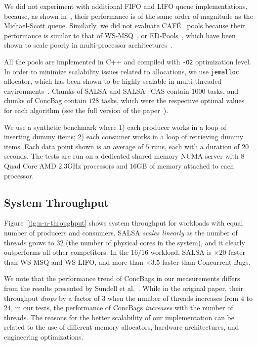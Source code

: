 We did not experiment with additional FIFO and LIFO queue implementations, because, as shown in~\cite{Sundell:2011:LAC:1989493.1989550}, their performance is of the same order of magnitude as the Michael-Scott queue. 
Similarly, we did not evaluate {CAF\'E}~\cite{Basin:2011:CST:2075029.2075087} pools because their performance is similar to that of WS-MSQ~\cite{Basin:Thesis:2011}, or ED-Pools~\cite{Afek:2010:SPP:1885276.1885295}, which have been shown to scale poorly in multi-processor architectures~\cite{Basin:Thesis:2011,Sundell:2011:LAC:1989493.1989550}. 

All the pools are implemented in C++ and compiled with \texttt{-O2} optimization level. 
In order to minimize scalability issues related to allocations, we use \texttt{jemalloc} allocator, which has been shown to be highly scalable in multi-threaded environments~\cite{jemalloc}. 
Chunks of SALSA and SALSA+CAS contain $1000$ tasks, and chunks of ConcBag contain $128$ tasks, which were the respective optimal values for each algorithm (see the full version of the paper~\cite{salsa-tech-rep}). 

We use a synthetic benchmark where 1) each producer works in a loop of inserting dummy items; 2) each consumer works in a loop of retrieving dummy items. Each data point shown is an average of $5$ runs, each with a duration of $20$ seconds. 
The tests are run on a dedicated shared memory NUMA server with $8$ Quad Core AMD $2.3$GHz processors and $16$GB of memory attached to each processor. 
\subsection{System Throughput}
\label{sec:eval-performance}

Figure~\ref{fig:n-n-throughput} shows system throughput for workloads with equal number of producers and consumers. SALSA \emph{scales linearly} as the number of threads grows to $32$ (the number of physical cores in the system), and it clearly outperforms all other competitors. In the $16/16$ workload, SALSA is $\times20$ faster than WS-MSQ and WS-LIFO, and more than $\times3.5$ faster than Concurrent Bags. 

We note that the performance trend of ConcBags in our measurements differs from the results presented by Sundell et al.~\cite{Sundell:2011:LAC:1989493.1989550}. 
While in the original paper, their throughput \emph{drops} by a factor of $3$ when the number of threads increases from $4$ to $24$, in our tests, the performance of ConcBags \emph{increases} with the number of threads. The reasons for the better scalability of our implementation can be related to the use of different memory allocators, hardware architectures, and engineering optimizations. %

